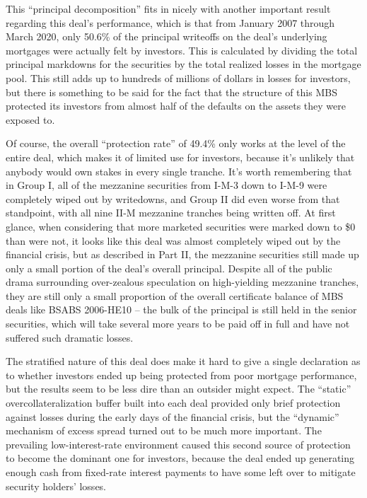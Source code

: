 \documentclass[12pt]{article}
\begin{document}
This “principal decomposition” fits in nicely with another important result regarding this deal’s performance, which is that from January 2007 through March 2020, only 50.6\% of the principal writeoffs on the deal’s underlying mortgages were actually felt by investors. This is calculated by dividing the total principal markdowns for the securities by the total realized losses in the mortgage pool. This still adds up to hundreds of millions of dollars in losses for investors, but there is something to be said for the fact that the structure of this MBS protected its investors from almost half of the defaults on the assets they were exposed to.
	
Of course, the overall “protection rate” of 49.4\% only works at the level of the entire deal, which makes it of limited use for investors, because it’s unlikely that anybody would own stakes in every single tranche. It’s worth remembering that in Group I, all of the mezzanine securities from I-M-3 down to I-M-9 were completely wiped out by writedowns, and Group II did even worse from that standpoint, with all nine II-M mezzanine tranches being written off. At first glance, when considering that more marketed securities were marked down to \$0 than were not, it looks like this deal was almost completely wiped out by the financial crisis, but as described in Part II, the mezzanine securities still made up only a small portion of the deal’s overall principal. Despite all of the public drama surrounding over-zealous speculation on high-yielding mezzanine tranches, they are still only a small proportion of the overall certificate balance of MBS deals like BSABS 2006-HE10 – the bulk of the principal is still held in the senior securities, which will take several more years to be paid off in full and have not suffered such dramatic losses.

The stratified nature of this deal does make it hard to give a single declaration as to whether investors ended up being protected from poor mortgage performance, but the results seem to be less dire than an outsider might expect. The “static” overcollateralization buffer built into each deal provided only brief protection against losses during the early days of the financial crisis, but the “dynamic” mechanism of excess spread turned out to be much more important. The prevailing low-interest-rate environment caused this second source of protection to become the dominant one for investors, because the deal ended up generating enough cash from fixed-rate interest payments to have some left over to mitigate security holders’ losses. 
\end{document}
